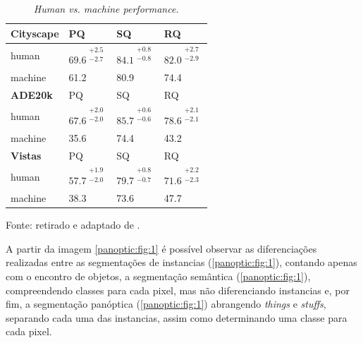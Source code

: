 \begin{table}[!ht]
    \centering
    \caption{\textit{Human vs. machine performance.}}
    \label{panoptic:table:1}
    \begin{tabular}{@{}l|lll@{}}
    \textbf{Cityscape} & PQ   & SQ   & RQ   \\ \hline
    human              & $69.6^{\substack{+2.5\\-2.7}}$ & $84.1^{\substack{+0.8\\-0.8}}$ &  $82.0^{\substack{+2.7\\-2.9}}$ \\
    machine            & 61.2 & 80.9 & 74.4 \vspace*{0.3cm}\\
    \textbf{ADE20k}    & PQ   & SQ   & RQ   \\ \hline
    human              & $67.6^{\substack{+2.0\\-2.0}}$ & $85.7^{\substack{+0.6\\-0.6}}$ & $78.6^{\substack{+2.1\\-2.1}}$ \\
    machine            & 35.6 & 74.4 & 43.2 \vspace*{0.3cm}\\
    \textbf{Vistas}    & PQ   & SQ   & RQ   \\ \hline
    human              & $57.7^{\substack{+1.9\\-2.0}}$ & $79.7^{\substack{+0.8\\-0.7}}$ & $71.6^{\substack{+2.2\\-2.3}}$ \\
    machine            & 38.3 & 73.6 & 47.7
    \end{tabular}

    \vspace*{1 cm}
    Fonte: retirado e adaptado de \cite{Kirillov2019a}.
\end{table}

A partir da imagem \ref{panoptic:fig:1} é possível observar as diferenciações realizadas entre as segmentações de instancias (\ref{panoptic:fig:1}), contando apenas com o encontro de objetos, a segmentação semântica (\ref{panoptic:fig:1}), compreendendo classes para cada pixel, mas não diferenciando instancias e, por fim, a segmentação panóptica (\ref{panoptic:fig:1}) abrangendo \textit{things} e \textit{stuffs}, separando cada uma das instancias, assim como determinando uma classe para cada pixel.

